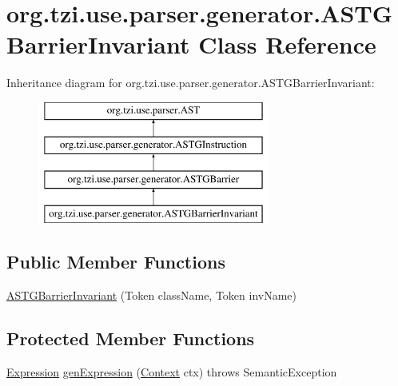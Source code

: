 \hypertarget{classorg_1_1tzi_1_1use_1_1parser_1_1generator_1_1_a_s_t_g_barrier_invariant}{\section{org.\-tzi.\-use.\-parser.\-generator.\-A\-S\-T\-G\-Barrier\-Invariant Class Reference}
\label{classorg_1_1tzi_1_1use_1_1parser_1_1generator_1_1_a_s_t_g_barrier_invariant}
}
Inheritance diagram for org.\-tzi.\-use.\-parser.\-generator.\-A\-S\-T\-G\-Barrier\-Invariant\-:\begin{figure}[H]
\begin{center}
\leavevmode
\includegraphics[height=4.000000cm]{classorg_1_1tzi_1_1use_1_1parser_1_1generator_1_1_a_s_t_g_barrier_invariant}
\end{center}
\end{figure}
\subsection*{Public Member Functions}
\begin{DoxyCompactItemize}
\item 
\hyperlink{classorg_1_1tzi_1_1use_1_1parser_1_1generator_1_1_a_s_t_g_barrier_invariant_a9a895910a86694e71962e9638515abb0}{A\-S\-T\-G\-Barrier\-Invariant} (Token class\-Name, Token inv\-Name)
\end{DoxyCompactItemize}
\subsection*{Protected Member Functions}
\begin{DoxyCompactItemize}
\item 
\hyperlink{classorg_1_1tzi_1_1use_1_1uml_1_1ocl_1_1expr_1_1_expression}{Expression} \hyperlink{classorg_1_1tzi_1_1use_1_1parser_1_1generator_1_1_a_s_t_g_barrier_invariant_ad86cbea64be57ec8a63cd827bf2c2a78}{gen\-Expression} (\hyperlink{classorg_1_1tzi_1_1use_1_1parser_1_1_context}{Context} ctx)  throws Semantic\-Exception 
\end{DoxyCompactItemize}


